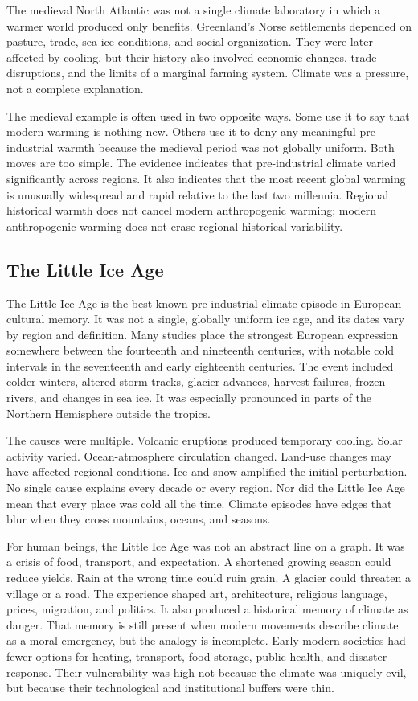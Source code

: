 ﻿\documentclass[12pt,a4paper]{book}
\begin{document}
The medieval North Atlantic was not a single climate laboratory in which a warmer world produced only benefits. Greenland's Norse settlements depended on pasture, trade, sea ice conditions, and social organization. They were later affected by cooling, but their history also involved economic changes, trade disruptions, and the limits of a marginal farming system. Climate was a pressure, not a complete explanation.

The medieval example is often used in two opposite ways. Some use it to say that modern warming is nothing new. Others use it to deny any meaningful pre-industrial warmth because the medieval period was not globally uniform. Both moves are too simple. The evidence indicates that pre-industrial climate varied significantly across regions. It also indicates that the most recent global warming is unusually widespread and rapid relative to the last two millennia. Regional historical warmth does not cancel modern anthropogenic warming; modern anthropogenic warming does not erase regional historical variability.

\subsection{The Little Ice Age}
The Little Ice Age is the best-known pre-industrial climate episode in European cultural memory. It was not a single, globally uniform ice age, and its dates vary by region and definition. Many studies place the strongest European expression somewhere between the fourteenth and nineteenth centuries, with notable cold intervals in the seventeenth and early eighteenth centuries. The event included colder winters, altered storm tracks, glacier advances, harvest failures, frozen rivers, and changes in sea ice. It was especially pronounced in parts of the Northern Hemisphere outside the tropics.

The causes were multiple. Volcanic eruptions produced temporary cooling. Solar activity varied. Ocean-atmosphere circulation changed. Land-use changes may have affected regional conditions. Ice and snow amplified the initial perturbation. No single cause explains every decade or every region. Nor did the Little Ice Age mean that every place was cold all the time. Climate episodes have edges that blur when they cross mountains, oceans, and seasons.

For human beings, the Little Ice Age was not an abstract line on a graph. It was a crisis of food, transport, and expectation. A shortened growing season could reduce yields. Rain at the wrong time could ruin grain. A glacier could threaten a village or a road. The experience shaped art, architecture, religious language, prices, migration, and politics. It also produced a historical memory of climate as danger. That memory is still present when modern movements describe climate as a moral emergency, but the analogy is incomplete. Early modern societies had fewer options for heating, transport, food storage, public health, and disaster response. Their vulnerability was high not because the climate was uniquely evil, but because their technological and institutional buffers were thin.
\end{document}
